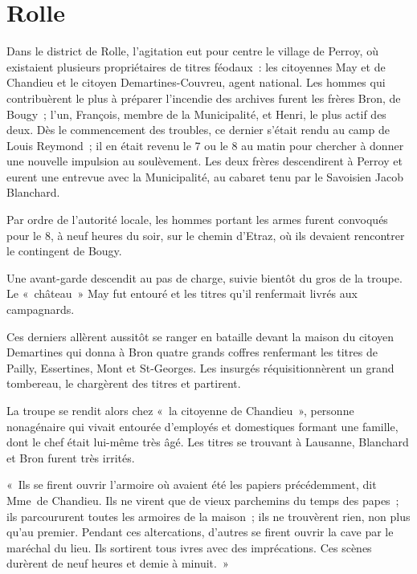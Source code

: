 \documentclass[french,twoside]{book} %
\newenvironment{quoteblock}%
  {\begin{quoting}}
  {\end{quoting}}
\newenvironment{quotebar}{%
    \def\FrameCommand{{\color{rubric!10!}\vrule width 0.5em} \hspace{0.9em}}%
    \def\OuterFrameSep{\itemsep} %
    \MakeFramed {\advance\hsize-\width \FrameRestore}
  }%
  {%
    \endMakeFramed
  }
\renewenvironment{quoteblock}%
  {%
    \savenotes
    \setstretch{0.9}
    \normalfont
    \begin{quotebar}
  }
  {%
    \end{quotebar}
    \spewnotes
  }
\begin{document}
\section[{Rolle}]{Rolle}
\noindent Dans le district de Rolle, l’agitation eut pour centre le village de Perroy, où existaient plusieurs propriétaires de titres féodaux : les citoyennes May et de Chandieu et le citoyen Demartines-Couvreu, agent national. Les hommes qui contribuèrent le plus à préparer l’incendie des archives furent les frères Bron, de Bougy ; l’un, François, membre de la Municipalité, et Henri, le plus actif des deux. Dès le commencement des troubles, ce dernier s’était rendu au camp de Louis Reymond ; il en était revenu le 7 ou le 8 au matin pour chercher à donner une nouvelle impulsion au soulèvement. Les deux frères descendirent à Perroy et eurent une entrevue avec la Municipalité, au cabaret tenu par le Savoisien Jacob Blanchard.\par
Par ordre de l’autorité locale, les hommes portant les armes furent convoqués pour le 8, à neuf heures du soir, sur le chemin d’Etraz, où ils devaient rencontrer le contingent de Bougy.\par
Une avant-garde descendit au pas de charge, suivie bientôt du gros de la troupe. Le « château » May fut entouré et les titres qu’il renfermait livrés aux campagnards.\par
Ces derniers allèrent aussitôt se ranger en bataille devant la maison du citoyen Demartines qui donna à Bron quatre grands coffres renfermant les titres de Pailly, Essertines, Mont et St-Georges. Les insurgés réquisitionnèrent un grand tombereau, le chargèrent des titres et partirent.\par
La troupe se rendit alors chez « la citoyenne de Chandieu », personne nonagénaire qui vivait entourée d’employés et domestiques formant une famille, dont le chef était lui-même très âgé. Les titres se trouvant à Lausanne, Blanchard et Bron furent très irrités.\par

\begin{quoteblock}
 \noindent « Ils se firent ouvrir l’armoire où avaient été les papiers précédemment, dit Mme de Chandieu. Ils ne virent que de vieux parchemins du temps des papes ; ils parcoururent toutes les armoires de la maison ; ils ne trouvèrent rien, non plus qu’au premier. Pendant ces altercations, d’autres se firent ouvrir la cave par le maréchal du lieu. Ils sortirent tous ivres avec des imprécations. Ces scènes durèrent de neuf heures et demie à minuit. »
 \end{quoteblock}
\end{document}

